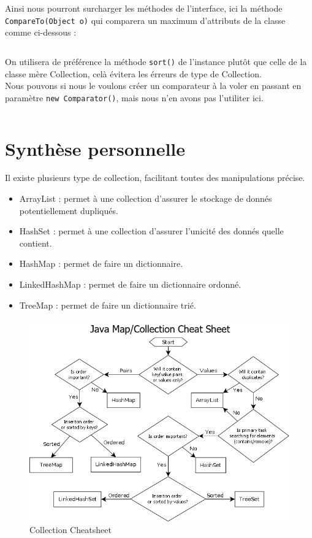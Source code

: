 Ainsi nous pourront surcharger les méthodes de l'interface, ici la méthode \texttt{CompareTo(Object o)} qui comparera un maximum d'attributs de la classe comme ci-dessous :
\inputminted[linenos,firstline=52,lastline=63]{java}{../sources/src/tp2/Cours.java}

On utilisera de préférence la méthode \texttt{sort()} de l'instance plutôt que celle de la classe mère Collection, celà évitera les érreurs de type de Collection.\\
Nous pouvons si nous le voulons créer un comparateur à la voler en passant en paramètre \texttt{new Comparator(){}}, mais nous n'en avons pas l'utiliter ici.
\inputminted[linenos,firstline=41,lastline=41]{java}{../sources/src/tp2/Main.java}

\section{Synthèse personnelle}
Il existe plusieurs type de collection, facilitant toutes des manipulations précise.
\begin{itemize}
  \item ArrayList : permet à une collection d'assurer le stockage de donnés potentiellement dupliqués.
  \item HashSet : permet à une collection d'assurer l'unicité des donnés quelle contient.
  \item HashMap : permet de faire un dictionnaire.
  \item LinkedHashMap : permet de faire un dictionnaire ordonné.
  \item TreeMap : permet de faire un dictionnaire trié.
\end{itemize}

\begin{figure}[H]
  \centering
  \includegraphics[width=400pt]{./tp/Pictures/tp2-collection-cheatsheet}
  \caption{Collection Cheatsheet}
  \label{Collection Cheatsheet}
\end{figure}

